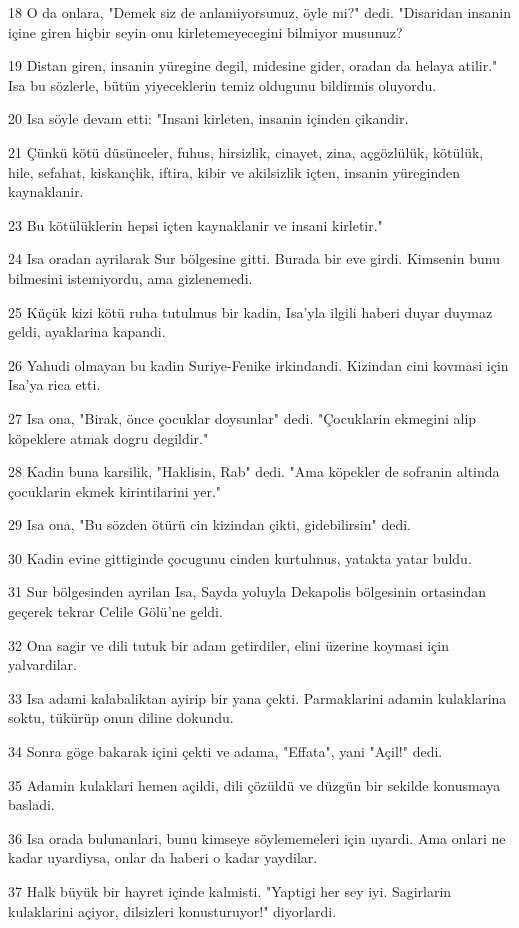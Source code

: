 \par 18 O da onlara, "Demek siz de anlamiyorsunuz, öyle mi?" dedi. "Disaridan insanin içine giren hiçbir seyin onu kirletemeyecegini bilmiyor musunuz?
\par 19 Distan giren, insanin yüregine degil, midesine gider, oradan da helaya atilir." Isa bu sözlerle, bütün yiyeceklerin temiz oldugunu bildirmis oluyordu.
\par 20 Isa söyle devam etti: "Insani kirleten, insanin içinden çikandir.
\par 21 Çünkü kötü düsünceler, fuhus, hirsizlik, cinayet, zina, açgözlülük, kötülük, hile, sefahat, kiskançlik, iftira, kibir ve akilsizlik içten, insanin yüreginden kaynaklanir.
\par 23 Bu kötülüklerin hepsi içten kaynaklanir ve insani kirletir."
\par 24 Isa oradan ayrilarak Sur bölgesine gitti. Burada bir eve girdi. Kimsenin bunu bilmesini istemiyordu, ama gizlenemedi.
\par 25 Küçük kizi kötü ruha tutulmus bir kadin, Isa'yla ilgili haberi duyar duymaz geldi, ayaklarina kapandi.
\par 26 Yahudi olmayan bu kadin Suriye-Fenike irkindandi. Kizindan cini kovmasi için Isa'ya rica etti.
\par 27 Isa ona, "Birak, önce çocuklar doysunlar" dedi. "Çocuklarin ekmegini alip köpeklere atmak dogru degildir."
\par 28 Kadin buna karsilik, "Haklisin, Rab" dedi. "Ama köpekler de sofranin altinda çocuklarin ekmek kirintilarini yer."
\par 29 Isa ona, "Bu sözden ötürü cin kizindan çikti, gidebilirsin" dedi.
\par 30 Kadin evine gittiginde çocugunu cinden kurtulmus, yatakta yatar buldu.
\par 31 Sur bölgesinden ayrilan Isa, Sayda yoluyla Dekapolis bölgesinin ortasindan geçerek tekrar Celile Gölü'ne geldi.
\par 32 Ona sagir ve dili tutuk bir adam getirdiler, elini üzerine koymasi için yalvardilar.
\par 33 Isa adami kalabaliktan ayirip bir yana çekti. Parmaklarini adamin kulaklarina soktu, tükürüp onun diline dokundu.
\par 34 Sonra göge bakarak içini çekti ve adama, "Effata", yani "Açil!" dedi.
\par 35 Adamin kulaklari hemen açildi, dili çözüldü ve düzgün bir sekilde konusmaya basladi.
\par 36 Isa orada bulunanlari, bunu kimseye söylememeleri için uyardi. Ama onlari ne kadar uyardiysa, onlar da haberi o kadar yaydilar.
\par 37 Halk büyük bir hayret içinde kalmisti. "Yaptigi her sey iyi. Sagirlarin kulaklarini açiyor, dilsizleri konusturuyor!" diyorlardi.

